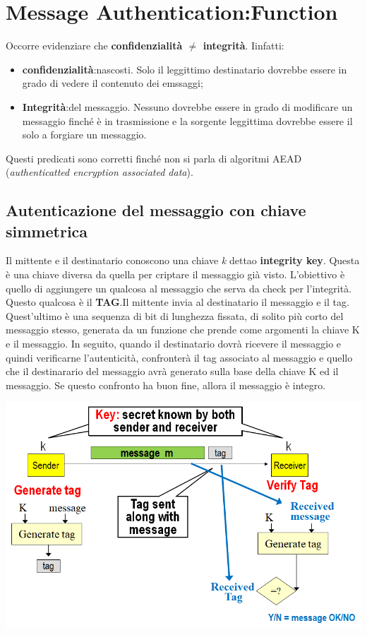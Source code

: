 \documentclass{book}
\theoremstyle{remark}
\begin{document}
\chapter{Message Authentication:\@Hash Function}
Occorre evidenziare che \textbf{confidenzialità \(\neq \) integrità}\@. Iinfatti:
\begin{itemize}
	\item \textbf{confidenzialità}:\@messaggi nascosti\@. Solo il leggittimo destinatario dovrebbe essere in grado di vedere il contenuto dei emssaggi;\@
	\item \textbf{Integrità}: del messaggio\@. Nessuno dovrebbe essere in grado di modificare un messaggio finché è in trasmissione e la sorgente leggittima dovrebbe essere il solo a forgiare un messaggio\@.
\end{itemize}
Questi predicati sono corretti finché non si parla di algoritmi AEAD (\emph{authenticatted encryption associated data})\@.
\section{Autenticazione del messaggio con chiave simmetrica}
Il mittente e il destinatario conoscono una chiave \emph{k} dettao \textbf{integrity key}\@. Questa è una chiave diversa da quella per criptare il messaggio già visto\@.
L'obiettivo è quello di aggiungere un qualcosa al messaggio che serva da check per l'integrità\@. Questo qualcosa è il \textbf{TAG}\@.Il mittente invia al destinatario il messaggio e il tag\@. Quest'ultimo è una sequenza di bit di lunghezza fissata, di solito più corto del messaggio stesso, generata da un funzione che prende come argomenti la chiave K e il messaggio\@. In seguito, quando il destinatario dovrà ricevere il messaggio e quindi verificarne l'autenticità, confronterà il tag associato al messaggio e quello che il destinarario del messaggio avrà generato sulla base della chiave K ed il messaggio\@. Se questo confronto ha buon fine, allora il messaggio è integro\@.
\begin{center}
	\includegraphics[scale=0.3]{MACSYM}
\end{center}
\end{document}
